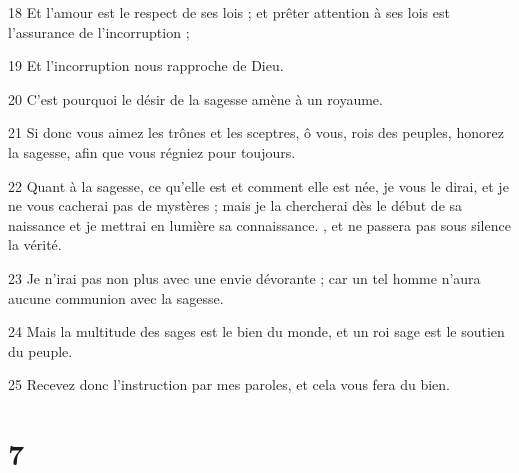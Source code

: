 \par 18 Et l'amour est le respect de ses lois ; et prêter attention à ses lois est l'assurance de l'incorruption ;
\par 19 Et l'incorruption nous rapproche de Dieu.
\par 20 C'est pourquoi le désir de la sagesse amène à un royaume.
\par 21 Si donc vous aimez les trônes et les sceptres, ô vous, rois des peuples, honorez la sagesse, afin que vous régniez pour toujours.
\par 22 Quant à la sagesse, ce qu'elle est et comment elle est née, je vous le dirai, et je ne vous cacherai pas de mystères ; mais je la chercherai dès le début de sa naissance et je mettrai en lumière sa connaissance. , et ne passera pas sous silence la vérité.
\par 23 Je n'irai pas non plus avec une envie dévorante ; car un tel homme n’aura aucune communion avec la sagesse.
\par 24 Mais la multitude des sages est le bien du monde, et un roi sage est le soutien du peuple.
\par 25 Recevez donc l'instruction par mes paroles, et cela vous fera du bien.

\chapter{7}

